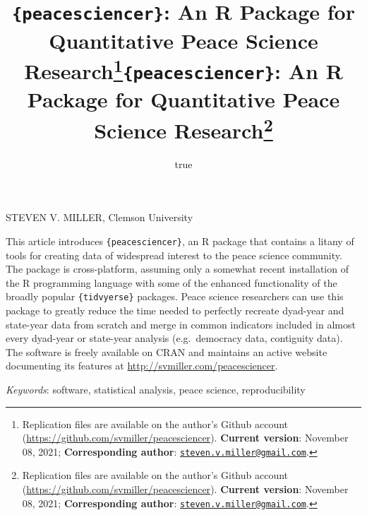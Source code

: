 \documentclass[
  11pt,
]{article}
\title{\texttt{\{peacesciencer\}}: An R Package for Quantitative Peace Science Research\thanks{Replication files are available on the author's Github account (\url{https://github.com/svmiller/peacesciencer}). \textbf{Current version}: November 08, 2021; \textbf{Corresponding author}: \href{mailto:steven.v.miller@gmail.com}{\nolinkurl{steven.v.miller@gmail.com}}.}}
\author{true}
\date{}
\title{\texttt{\{peacesciencer\}}: An R Package for Quantitative Peace Science Research\thanks{Replication files are available on the author's Github account (\url{https://github.com/svmiller/peacesciencer}). \textbf{Current version}: November 08, 2021; \textbf{Corresponding author}: \href{mailto:steven.v.miller@gmail.com}{\nolinkurl{steven.v.miller@gmail.com}}.}  }
\date{}
\renewenvironment{abstract}
 {{%
    \setlength{\leftmargin}{0mm}
    \setlength{\rightmargin}{\leftmargin}%
  }%
  \relax}
 {\endlist}
\begin{document}



{%
\setlength{\parindent}{0pt}
\thispagestyle{plain}
{%
\maketitle  %

}




{
   \vskip 13.5pt\relax \normalsize\fontsize{11}{12}
   \MakeUppercase{Steven V. Miller}, \small{Clemson University}   

}

}








\begin{abstract}


    \vskip 8.5pt %

\noindent \small{This article introduces \texttt{\{peacesciencer\}}, an R package that contains a litany of tools for creating data of widespread interest to the peace science community. The package is cross-platform, assuming only a somewhat recent installation of the R programming language with some of the enhanced functionality of the broadly popular \texttt{\{tidvyerse\}} packages. Peace science researchers can use this package to greatly reduce the time needed to perfectly recreate dyad-year and state-year data from scratch and merge in common indicators included in almost every dyad-year or state-year analysis (e.g.~democracy data, contiguity data). The software is freely available on CRAN and maintains an active website documenting its features at \url{http://svmiller.com/peacesciencer}.}


\vskip 8.5pt \noindent \emph{Keywords}: software, statistical analysis, peace science, reproducibility \par




\end{abstract}
\end{document}
